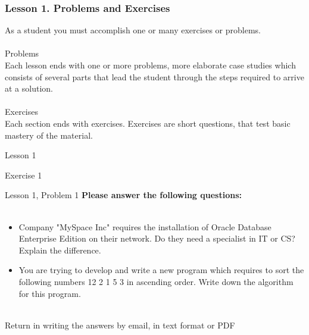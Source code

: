 \documentclass[aspectratio=1610]{beamer}
\begin{document}

\begin{frame}
\frametitle{Lesson 1. Problems and Exercises}
\LARGE
As a student you must accomplish one or many exercises or problems.\\~\\
\Large \alert{Problems}\\
Each lesson ends with one or more problems, more elaborate case studies which consists of several parts that lead the student through the steps required to arrive at a solution.
\\~\\ 
\Large \alert{Exercises} \\
Each section ends with exercises. Exercises are short questions, that test basic mastery of the material.
\end{frame}

\begin{frame}{Lesson 1}{}
\begin{center}
\Huge Exercise 1
\end{center}
\end{frame}

\begin{frame}{Lesson 1, Problem 1}{}
\Large
\textbf{Please answer the following questions:}\\~\\ 

\Large{
\begin{itemize}
    \item Company "MySpace Inc" requires the installation of Oracle Database Enterprise Edition on their network. Do they need a specialist in IT or CS? Explain the difference.
    \item You are trying to develop and write a new program which requires to sort the following numbers 12 2 1 5 3 in ascending order. Write down the algorithm for this program. \\~\\
\end{itemize}}

Return in writing the answers by email, in text format or PDF
\end{frame}
\end{document}
